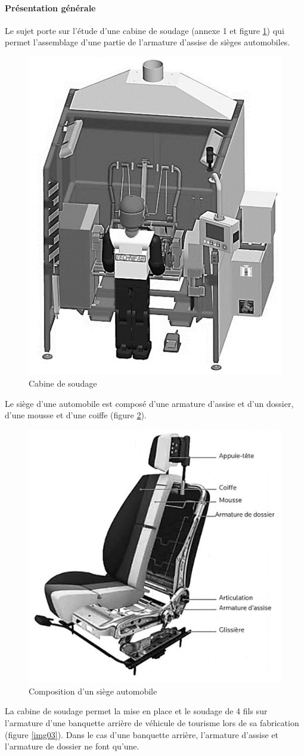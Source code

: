 


\paragraph{Présentation générale}

Le sujet porte sur l’étude d’une cabine de soudage (annexe 1 et figure \ref{img01}) qui permet l’assemblage d’une partie de l’armature d’assise de sièges automobiles.

\begin{figure}[!h]
\centering\includegraphics[width=0.35\linewidth]{img/fig01}
 \caption{Cabine de soudage}
 \label{img01}
\end{figure}

Le siège d’une automobile est composé d’une armature d’assise et d’un dossier, d’une mousse et d’une coiffe (figure \ref{img02}).

\begin{figure}[!h]
\centering\includegraphics[width=0.5\linewidth]{img/fig02}
 \caption{Composition d’un siège automobile}
 \label{img02}
\end{figure}

La cabine de soudage permet la mise en place et le soudage de 4 fils sur l’armature d’une banquette arrière de véhicule de tourisme lors de sa fabrication (figure \ref{img03}). Dans le cas d’une banquette arrière, l’armature d’assise et l’armature de dossier ne font qu’une.

